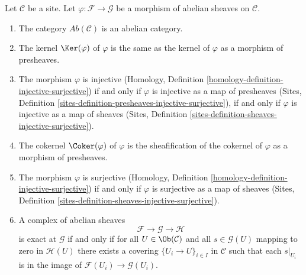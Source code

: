 \begin{lemma}
\label{lemma-abelian-abelian}
Let $\mathcal{C}$ be a site. Let $\varphi : \mathcal{F} \to \mathcal{G}$
be a morphism of abelian sheaves on $\mathcal{C}$.
\begin{enumerate}
\item The category $\textit{Ab}(\mathcal{C})$ is an abelian category.
\item The kernel $\Ker(\varphi)$ of $\varphi$ is the same as the
kernel of $\varphi$ as a morphism of presheaves.
\item The morphism $\varphi$ is injective
(Homology, Definition \ref{homology-definition-injective-surjective})
if and only if $\varphi$ is injective as a map of presheaves
(Sites, Definition \ref{sites-definition-presheaves-injective-surjective}),
if and only if $\varphi$ is injective as a map of sheaves
(Sites, Definition \ref{sites-definition-sheaves-injective-surjective}).
\item The cokernel $\Coker(\varphi)$ of $\varphi$ is the sheafification
of the cokernel of $\varphi$ as a morphism of presheaves.
\item The morphism $\varphi$ is surjective
(Homology, Definition \ref{homology-definition-injective-surjective})
if and only if $\varphi$ is surjective as a map of sheaves
(Sites, Definition \ref{sites-definition-sheaves-injective-surjective}).
\item A complex of abelian sheaves
$$
\mathcal{F} \to \mathcal{G} \to \mathcal{H}
$$
is exact at $\mathcal{G}$ if and only if for all
$U \in \Ob(\mathcal{C})$ and all $s \in \mathcal{G}(U)$
mapping to zero in $\mathcal{H}(U)$ there exists a covering
$\{U_i \to U\}_{i \in I}$ in $\mathcal{C}$ such that each
$s|_{U_i}$ is in the image of $\mathcal{F}(U_i) \to \mathcal{G}(U_i)$.
\end{enumerate}
\end{lemma}

